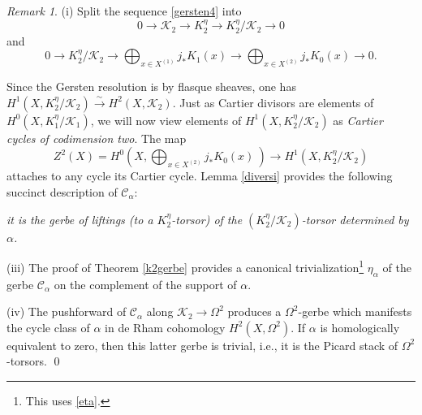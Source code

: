\documentclass{amsart}
\numberwithin{equation}{subsection}
\theoremstyle{remark}
\newtheorem{remark}[theorem]{Remark}
\theoremstyle{remark}
\newcommand{\too}{\longrightarrow}%
\newcommand{\cC}{\mathcal{C}}
\newcommand{\cK}{\mathcal{K}}
\begin{document}
\begin{remark}\label{trivial-eta} (i) Split the sequence \eqref{gersten4} into
  \begin{equation*}
    0 \too \cK_2 \too K_2^{\eta} \too K_2^{\eta}/{\cK_2} \too 0
  \end{equation*}
  and
  \begin{equation*}
    0 \too K_2^{\eta}/{\cK_2} \too \bigoplus_{x \in X^{(1)}} j_* K_1(x)  \too \bigoplus_{x \in X^{(2)}} j_* K_0(x) \too 0.
  \end{equation*}

Since the Gersten resolution is by flasque sheaves, one has $H^1(X, K_2^{\eta}/{\cK_2}) \xrightarrow{\sim} H^2(X, \cK_2)$. Just as Cartier divisors are elements of $H^0(X, K_1^{\eta}/{\cK_1})$, we will now view elements of $H^1(X, K_2^{\eta}/{\cK_2})$ as \emph{Cartier cycles of codimension two}. The map 
\begin{equation*} Z^2(X) = H^0(X, \bigoplus_{x \in X^{(2)}} j_* K_0(x)~)  \to H^1(X, K_2^{\eta}/{\cK_2})
\end{equation*} attaches to any cycle its Cartier cycle.  Lemma \ref{diversi} provides the following succinct description of $\cC_{\alpha}$: 

\emph{it is the gerbe of liftings (to a $K_2^{\eta}$-torsor) of the $(K_2^{\eta}/{\cK_2})$-torsor determined by $\alpha$.}
 
 (iii) The proof of Theorem \ref{k2gerbe} provides a canonical trivialization\footnote{This uses \eqref{eta}.} $\eta_{\alpha}$ of the gerbe $\cC_{\alpha}$ on the complement of the support of $\alpha$.
 
 (iv) The pushforward of $\cC_{\alpha}$ along $\cK_2 \to \Omega^2$ produces a $\Omega^2$-gerbe which manifests the cycle class of $\alpha$ in de Rham cohomology $H^2(X, \Omega^2)$. If $\alpha$ is homologically equivalent to zero, then this latter gerbe is trivial, i.e., it is the Picard stack of $\Omega^2$-torsors. \qed\end{remark} 
\end{document}

